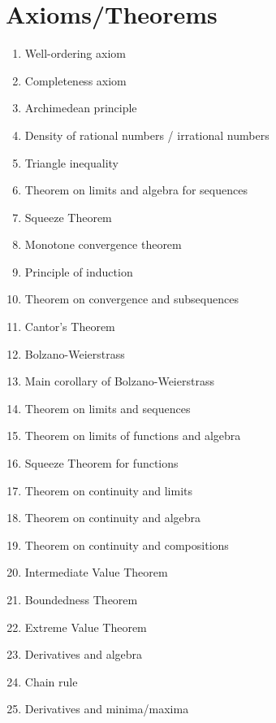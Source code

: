 \documentclass[12pt]{amsart}
\begin{document}
\section*{Axioms/Theorems}

\begin{enumerate}
	\item Well-ordering axiom
	\item Completeness axiom
	\item Archimedean principle
	\item Density of rational numbers / irrational numbers


	\item Triangle inequality

	\item Theorem on limits and algebra for sequences

	\item Squeeze Theorem
	\item Monotone convergence theorem
		\item Principle of induction
				
	\item Theorem on convergence and subsequences


	\item Cantor's Theorem
	


	\item Bolzano-Weierstrass

	\item Main corollary of Bolzano-Weierstrass


	\item Theorem on limits and sequences
	\item Theorem on limits of functions and algebra
	\item Squeeze Theorem for functions


	\item Theorem on continuity and limits
	
	\item Theorem on continuity and algebra
	\item Theorem on continuity and compositions
							\item Intermediate Value Theorem
	\item Boundedness Theorem
	\item Extreme Value Theorem
	
	

	\item Derivatives and algebra 

	\item Chain rule
		\item Derivatives and minima/maxima
		\begin{comment}
			\item Mean Value Theorem
	\item Increasing/decreasing functions and derivatives
\end{comment}
\end{enumerate}
\end{document}
